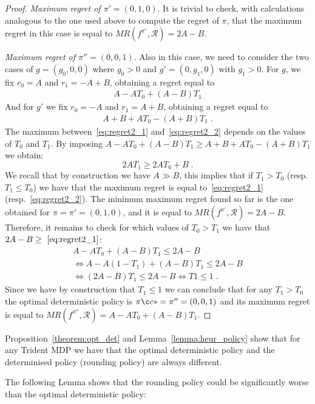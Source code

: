 \begin{proof}
\textit{Maximum regret of $\pi' = (0, 1, 0)$}.
It is trivial to check, with calculations analogous to the one used above to compute the regret of $\pi$, that the maximum regret in this case is equal to $MR(f^{\pi'}, \mathcal{R}) = 2A-B$.


\textit{Maximum regret of $\pi'' = (0, 0, 1)$}.
Also in this case, we need to consider the two cases of $g =(g_0, 0 ,0)$ where $g_0 > 0$ and $g' = (0, g_1, 0)$ with $g_1 > 0$. For $g$, we fix $r_0 = A$ and $r_1 = -A+B$, obtaining a regret equal to 
\begin{align}
A- A T_0 +(A-B) T_1 \label{eq:regret2_1}
\end{align}
And for $g'$ we fix $r_0 = -A$ and $r_1 = A+B$, obtaining a regret equal to 
\begin{align}
A+B+A T_0 -(A+B) T_1\;. \label{eq:regret2_2}
\end{align}
The maximum between~\eqref{eq:regret2_1} and~\eqref{eq:regret2_2} depends on the values of $T_0$ and $T_1$.
By imposing  $A- A T_0 +(A-B) T_1 \geq A+B+A T_0 -(A+B) T_1$ we obtain:
$$ 2A T_1 \geq 2 A T_0 + B\;. $$
We recall that by construction we have $A \gg B$, this implies that if $T_1> T_0$ (resp. $T_1\leq T_0$)  we have that the maximum regret is equal to~\eqref{eq:regret2_1} (resp.~\eqref{eq:regret2_2}).
The minimum maximum regret found so far is the one obtained for $\pi = \pi' = (0, 1, 0)$, and it is equal to $MR(f^{\pi'}, \mathcal{R}) = 2A-B$. Therefore, it remains to check for which values of $T_0 > T_1$ we have that $2A-B \geq~\eqref{eq:regret2_1}$:
\begin{align*}
A- A T_0 +(A-B) T_1 \leq 2A - B \\
 \Leftrightarrow A- A (1-T_1) +(A-B) T_1 \leq 2A - B\\
  \Leftrightarrow (2A-B)T_1 \leq 2A-B  \Leftrightarrow T1 \leq 1\;.
\end{align*}
 Since we have by construction that $T_1 \leq1$ we can conclude that for any $T_1> T_0$ the optimal deterministic policy is $\piç* = \pi''= (0, 0,1)$ and its maximum regret is equal to $MR(f^{\pi''}, \mathcal{R}) = A- A T_0 +(A-B) T_1$. 
\end{proof}

Proposition~\ref{theorem:opt_det} and Lemma~\ref{lemma:heur_policy} show that for any Trident MDP we have that the optimal deterministic policy and the determinised policy (rounding policy) are always different.


The following Lemma shows that the rounding policy could be significantly worse than the optimal deterministic policy:

